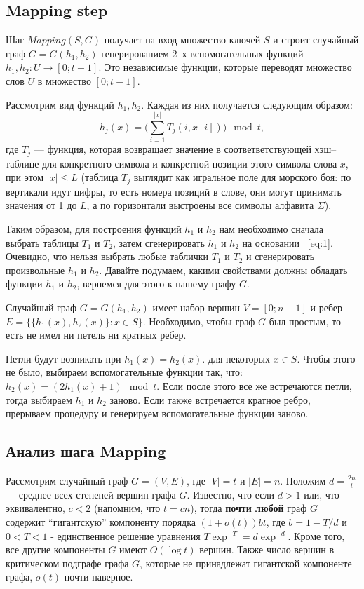 \documentclass[specialist,
               substylefile = spbu.rtx,
               subf,href,colorlinks=true, 12pt]{disser}
\begin{document}
\subsection{Mapping step}

Шаг $Mapping (S, G)$ получает на вход множество ключей $S$ и строит случайный граф $G = G(h_1, h_2)$  генерированием 2--х вспомогательных функций $h_1, h_2 : U \longrightarrow [0;t - 1]$. Это независимые функции, которые переводят множество слов $U$ в множество $[0; t - 1]$.

Рассмотрим вид функций $h_1, h_2$. Каждая из них получается следующим образом:
%
\begin{equation}\label{eq:1}
h_j(x) = \Big ( \sum \limits_{i = 1}^{|x|}T_j(i,x[i])\Big)\mod t,
\end{equation}
%
где $T_j$ --- функция, которая возвращает значение в соответветствующей хэш--таблице для конкретного символа и конкретной позиции этого символа слова $x$, при этом $|x| \leq L$ (таблица $T_j$ выглядит как игральное поле для морского боя: по вертикали идут цифры, то есть номера позиций в слове, они могут принимать значения от 1 до $L$, а по горизонтали выстроены все символы алфавита $\Sigma$).

Таким образом, для построения функций $h_1$ и $h_2$ нам необходимо сначала выбрать таблицы $T_1$ и $T_2$, затем сгенерировать $h_1$ и $h_2$ на основании ~\ref{eq:1}. Очевидно, что нельзя выбрать любые таблички $T_1$ и $T_2$ и сгенерировать произвольные $h_1$ и $h_2$. Давайте подумаем, какими свойствами должны обладать функции $h_1$ и $h_2$, вернемся для этого к нашему графу $G$.

Случайный граф $G = G(h_1, h_2)$ имеет набор вершин $V = [0;n - 1]$ и ребер $E = \{\{h_1(x),h_2(x)\}: x \in S\}$. Необходимо, чтобы граф $G$ был простым, то есть не имел ни петель ни кратных ребер.

Петли будут возникать при $h_1(x) = h_2(x)$. для некоторых $x \in S$. Чтобы этого не было, выбираем вспомогательные функции так, что: $h_2(x) = (2h_1(x) + 1)\mod t$. Если после этого все же встречаются петли, тогда выбираем $h_1$ и $h_2$ заново. Если также встречается кратное ребро, прерываем процедуру и генерируем вспомогательные функции заново.

\subsection{Анализ шага Mapping} \label{sec:mapan}

Рассмотрим случайный граф $G = (V,E)$, где $|V| = t$ и $|E| = n$. Положим $d = \frac{2n}{t}$ --- среднее всех степеней вершин графа $G$. Известно, что если $d > 1$ или, что эквивалентно, $c < 2$ (напомним, что $t = cn$), тогда \textbf{почти любой} граф $G$ содержит ``гигантскую'' компоненту порядка $(1+\mathit{o}(t))bt$, где $b = 1 - T/d$ и $0 < T < 1$ - единственное решение уравнения $T\exp^{-T} = d\exp^{-d}$. Кроме того, все другие компоненты $G$ имеют $\mathit{O}(\log t)$ вершин. Также число вершин в критическом подграфе графа $G$, которые не принадлежат гигантской компоненте графа, $\mathit{o}(t)$ почти наверное.
\end{document}
